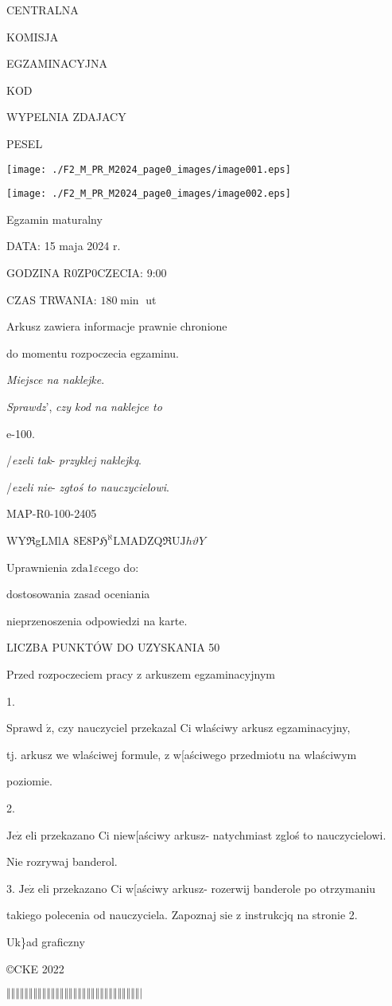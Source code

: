 \documentclass[a4paper,12pt]{article}
\begin{document}
CENTRALNA

KOMISJA

EGZAMINACYJNA

KOD

WYPELNIA ZDAJACY

PESEL
\begin{center}
\texttt{[image: ./F2\_M\_PR\_M2024\_page0\_images/image001.eps]}

\texttt{[image: ./F2\_M\_PR\_M2024\_page0\_images/image002.eps]}
\end{center}
Egzamin maturalny

DATA: 15 maja 2024 r.

GODZINA R0ZP0CZECIA: 9:00

CZAS TRWANIA: $180 \displaystyle \min$ ut

Arkusz zawiera informacje prawnie chronione

do momentu rozpoczecia egzaminu.

{\it Miejsce na naklejke}.

{\it Sprawdz}', {\it czy kod na naklejce to}

e-100.

/{\it ezeli tak}- {\it przyklej naklejkq}.

/{\it ezeli nie}- {\it zgtoś to nauczycielowi}.

MAP-R0-100-2405

$\mathrm{W}\mathrm{Y}\Re$gLMlA 8$\mathrm{E}8\mathrm{P}\mathfrak{H}^{\aleph}\mathrm{L}\mathrm{M}\mathrm{A}\mathrm{D}\mathrm{Z}\mathrm{Q}\Re \mathrm{U}\mathrm{J}h\vartheta Y$

Uprawnienia $\mathrm{z}\mathrm{d}\mathrm{a}1\varepsilon$cego do:

\fbox{} dostosowania zasad oceniania

\fbox{} nieprzenoszenia odpowiedzi na karte.

LICZBA PUNKTÓW DO UZYSKANIA 50

Przed rozpoczeciem pracy z arkuszem egzaminacyjnym

1.

Sprawd $\acute{\mathrm{z}}$, czy nauczyciel przekazal Ci wlaściwy arkusz egzaminacyjny,

tj. arkusz we wlaściwej formule, z w[aściwego przedmiotu na wlaściwym

poziomie.

2.

$\mathrm{J}\mathrm{e}\dot{\mathrm{z}}$ eli przekazano Ci niew[aściwy arkusz- natychmiast zgloś to nauczycielowi.

Nie rozrywaj banderol.

3. $\mathrm{J}\mathrm{e}\dot{\mathrm{z}}$ eli przekazano Ci w[aściwy arkusz- rozerwij banderole po otrzymaniu

takiego polecenia od nauczyciela. Zapoznaj $\mathrm{s}\mathrm{i}\mathrm{e}$ z instrukcjq na stronie 2.

Uk\}ad graficzny

\copyright CKE 2022

$\Vert\Vert\Vert\Vert\Vert\Vert\Vert\Vert\Vert\Vert\Vert\Vert\Vert\Vert\Vert\Vert\Vert\Vert\Vert\Vert\Vert\Vert\Vert\Vert\Vert\Vert\Vert\Vert\Vert\Vert|$
\end{document}

